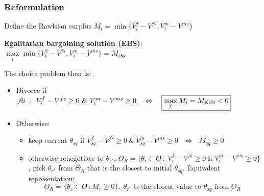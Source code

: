 \documentclass[aspectratio=169]{beamer}
\let\olditem\item
\renewcommand{\item}{%
\olditem\vspace{\fill}}
\begin{document}
\begin{frame}
\frametitle{Reformulation}
Define the Rawlsian surplus $M_i = \min \{ V^f_i - V^{fs}, V^m_i - V^{ms} \}$

\textbf{Egalitarian bargaining solution (EBS)}: $\max\limits_i \min \{ V^f_i - V^{fs}, V^m_i - V^{ms} \} = M_{ebs}$

The choice problem then is:
\begin{itemize}
\item Divorce if $\not\exists i \ : \ V^f_i - V^{fs}  \geq 0\ \& \ V^m_i - V^{ms} \geq 0 \ \ \ \Leftrightarrow \ \ \ \boxed{ \max\limits_i M_i = M_{\text{EBS}} < 0 }$
\item Otherwise: 
\begin{itemize}
\item keep current $\theta_{sq}$ if $V^f_{sq} - V^{fs} \geq 0\ \& \ V^m_{sq} - V^{ms} \geq 0 \ \ \  \Leftrightarrow \ \ \ \boxed{ M_{sq} \geq 0 }$
\item otherwise renegotiate to $\theta_{r^*}$: $\Theta_R = \{\theta_r \in \Theta \ : \ V^f_r - V^{fs} \geq 0\ \& \ V^m_r - V^{ms} \geq 0\}$, pick $\theta_{r^*}$ from $\Theta_R$ that is the closest to initial $\theta_{sq}$. Equivalent representation: 
\[ \boxed{ \Theta_R = \{\theta_r \in \Theta \ : M_r \geq 0 \}. \ \ \theta_{r^*} \text{ is the closest value to $\theta_{sq}$ from $\Theta_R$ } }\]
\end{itemize}
\end{itemize}
\end{frame}
\end{document}
